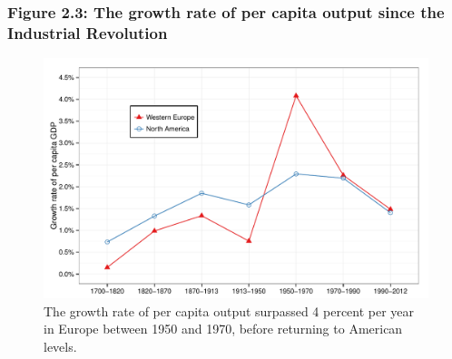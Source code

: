 \documentclass[t]{beamer}\usepackage[]{graphicx}\usepackage[]{color}
\newenvironment{knitrout}{}{} %
\begin{document}
\begin{frame}[label=Figure_2_3]
\frametitle{Figure 2.3: The growth rate of per capita output since the Industrial Revolution}
\begin{figure}[t]
\begin{minipage}[b]{\textwidth}
\centering
\begin{knitrout}\footnotesize
{}\color{fgcolor}

{\centering \includegraphics[width=1\linewidth]{figures/color/Figure_2_3} 

}



\end{knitrout}
\caption{The growth rate of per capita output surpassed 4 percent per year in Europe between 1950 and 1970, before returning to American levels.}
\end{minipage}
\end{figure}
\end{frame}
\end{document}
